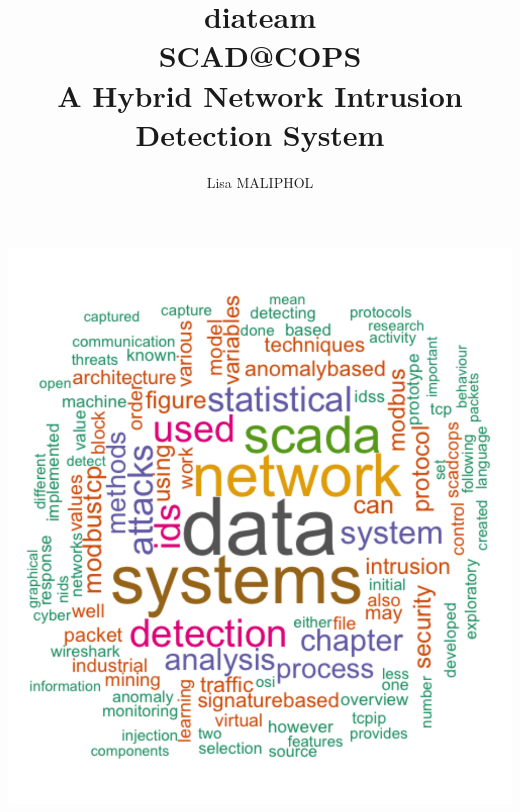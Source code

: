 \documentclass[11pt,]{article}
\title{diateam\\SCAD@COPS\\A Hybrid Network Intrusion Detection System}
\author{Lisa MALIPHOL}
\date{}
\begin{document}
\maketitle


\includegraphics{thesis_files/figure-latex/unnamed-chunk-3-1.pdf}

\thispagestyle{empty}

\newpage
\thispagestyle{empty} \mbox{}

\clearpage
{}
\end{document}
